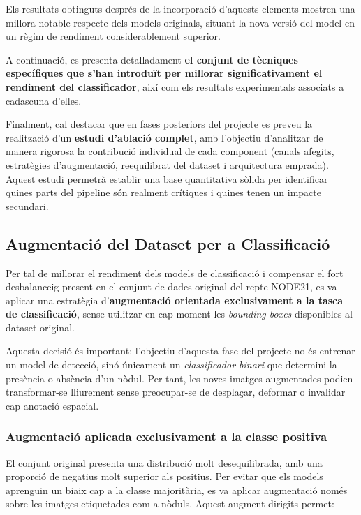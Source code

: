 \documentclass[12pt,a4paper]{article}
\begin{document}
Els resultats obtinguts després de la incorporació d’aquests elements mostren una
millora notable respecte dels models originals, situant la nova versió del model en un
règim de rendiment considerablement superior.

A continuació, es presenta detalladament \textbf{el conjunt de tècniques específiques que
s’han introduït per millorar significativament el rendiment del classificador}, així com
els resultats experimentals associats a cadascuna d’elles.

Finalment, cal destacar que en fases posteriors del projecte es preveu la realització
d’un \textbf{estudi d’ablació complet}, amb l’objectiu d’analitzar de manera rigorosa la
contribució individual de cada component (canals afegits, estratègies d’augmentació,
reequilibrat del dataset i arquitectura emprada). Aquest estudi permetrà establir una
base quantitativa sòlida per identificar quines parts del pipeline són realment
crítiques i quines tenen un impacte secundari.


\subsection{Augmentació del Dataset per a Classificació}

Per tal de millorar el rendiment dels models de classificació i compensar el fort
desbalanceig present en el conjunt de dades original del repte NODE21, es va aplicar una
estratègia d'\textbf{augmentació orientada exclusivament a la tasca de classificació},
sense utilitzar en cap moment les \textit{bounding boxes} disponibles al dataset
original.

Aquesta decisió és important: l'objectiu d’aquesta fase del projecte no és entrenar un
model de detecció, sinó únicament un \textit{classificador binari} que determini la
presència o absència d’un nòdul. Per tant, les noves imatges augmentades podien
transformar-se lliurement sense preocupar-se de desplaçar, deformar o invalidar cap
anotació espacial.

\subsubsection*{Augmentació aplicada exclusivament a la classe positiva}

El conjunt original presenta una distribució molt desequilibrada, amb una proporció de
negatius molt superior als positius. Per evitar que els models aprenguin un biaix cap a
la classe majoritària, es va aplicar augmentació només sobre les imatges etiquetades com
a nòduls. Aquest augment dirigits permet:
\end{document}
